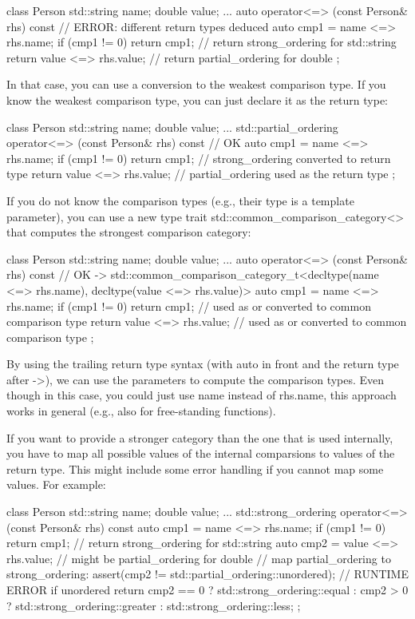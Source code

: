 \begin{cpp}
class Person {
	std::string name;
	double value;
	...
	auto operator<=> (const Person& rhs) const { // ERROR: different return types deduced
		auto cmp1 = name <=> rhs.name;
		if (cmp1 != 0) return cmp1; // return strong_ordering for std::string
		return value <=> rhs.value; // return partial_ordering for double
	}
};
\end{cpp}

In that case, you can use a conversion to the weakest comparison type. If you know the weakest comparison type, you can just declare it as the return type:

\begin{cpp}
class Person {
	std::string name;
	double value;
	...
	std::partial_ordering operator<=> (const Person& rhs) const { // OK
		auto cmp1 = name <=> rhs.name;
		if (cmp1 != 0) return cmp1; // strong_ordering converted to return type
		return value <=> rhs.value; // partial_ordering used as the return type
	}
};
\end{cpp}

If you do not know the comparison types (e.g., their type is a template parameter), you can use a new type trait std::common\_comparison\_category<> that computes the strongest comparison category:

\begin{cpp}
class Person {
	std::string name;
	double value;
	...
	auto operator<=> (const Person& rhs) const // OK
	-> std::common_comparison_category_t<decltype(name <=> rhs.name),
										 decltype(value <=> rhs.value)> {
		auto cmp1 = name <=> rhs.name;
		if (cmp1 != 0) return cmp1; // used as or converted to common comparison type
		return value <=> rhs.value; // used as or converted to common comparison type
	}
};
\end{cpp}

By using the trailing return type syntax (with auto in front and the return type after ->), we can use the parameters to compute the comparison types. Even though in this case, you could just use name instead of rhs.name, this approach works in general (e.g., also for free-standing functions).

If you want to provide a stronger category than the one that is used internally, you have to map all possible values of the internal comparsions to values of the return type. This might include some error handling if you cannot map some values. For example:

\begin{cpp}
class Person {
	std::string name;
	double value;
	...
	std::strong_ordering operator<=> (const Person& rhs) const {
		auto cmp1 = name <=> rhs.name;
		if (cmp1 != 0) return cmp1; // return strong_ordering for std::string
		auto cmp2 = value <=> rhs.value; // might be partial_ordering for double
		// map partial_ordering to strong_ordering:
		assert(cmp2 != std::partial_ordering::unordered); // RUNTIME ERROR if unordered
		return cmp2 == 0 ? std::strong_ordering::equal
		                 : cmp2 > 0 ? std::strong_ordering::greater
		                            : std::strong_ordering::less;
	}
};
\end{cpp}

